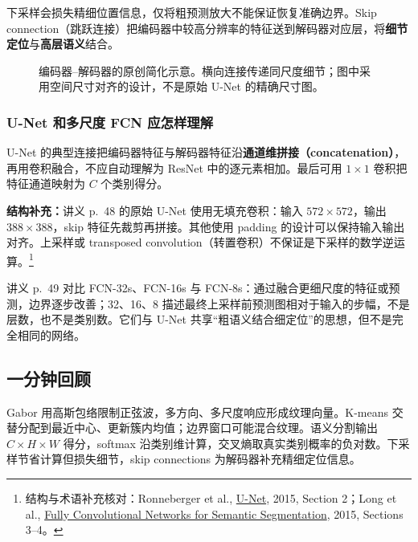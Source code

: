 下采样会损失精细位置信息，仅将粗预测放大不能保证恢复准确边界。Skip connection（跳跃连接）把编码器中较高分辨率的特征送到解码器对应层，将\textbf{细节定位}与\textbf{高层语义}结合。

\begin{figure}[htbp]
  \centering
  \resizebox{0.96\textwidth}{!}{}
  \caption{编码器--解码器的原创简化示意。横向连接传递同尺度细节；图中采用空间尺寸对齐的设计，不是原始 U-Net 的精确尺寸图。}
  \label{fig:sc4061-l08-unet}
\end{figure}

\subsubsection*{U-Net 和多尺度 FCN 应怎样理解}

U-Net 的典型连接把编码器特征与解码器特征沿\textbf{通道维拼接（concatenation）}，再用卷积融合，不应自动理解为 ResNet 中的逐元素相加。最后可用 $1\times1$ 卷积把特征通道映射为 $C$ 个类别得分。

\textbf{结构补充：}讲义 p.~48 的原始 U-Net 使用无填充卷积：输入 $572\times572$，输出 $388\times388$，skip 特征先裁剪再拼接。其他使用 padding 的设计可以保持输入输出对齐。上采样或 transposed convolution（转置卷积）不保证是下采样的数学逆运算。\footnote{结构与术语补充核对：Ronneberger et al., \href{https://arxiv.org/abs/1505.04597}{U-Net}, 2015, Section 2；Long et al., \href{https://openaccess.thecvf.com/content_cvpr_2015/html/Long_Fully_Convolutional_Networks_2015_CVPR_paper.html}{Fully Convolutional Networks for Semantic Segmentation}, 2015, Sections 3--4。}

讲义 p.~49 对比 FCN-32s、FCN-16s 与 FCN-8s：通过融合更细尺度的特征或预测，边界逐步改善；32、16、8 描述最终上采样前预测图相对于输入的步幅，不是层数，也不是类别数。它们与 U-Net 共享“粗语义结合细定位”的思想，但不是完全相同的网络。

\subsection{一分钟回顾}

Gabor 用高斯包络限制正弦波，多方向、多尺度响应形成纹理向量。K-means 交替分配到最近中心、更新簇内均值；边界窗口可能混合纹理。语义分割输出 $C\times H\times W$ 得分，softmax 沿类别维计算，交叉熵取真实类别概率的负对数。下采样节省计算但损失细节，skip connections 为解码器补充精细定位信息。
